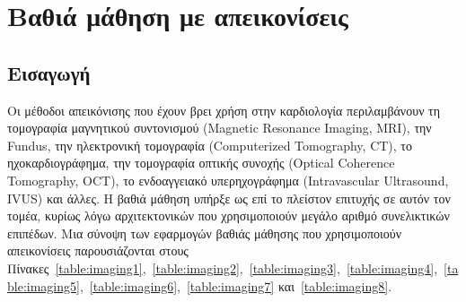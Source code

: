 \chapter{Βαθιά μάθηση με απεικονίσεις}
\label{chapter4}
\graphicspath{{./images/deep-learning-in-cardiology/}}

\section{Εισαγωγή}
Οι μέθοδοι απεικόνισης που έχουν βρει χρήση στην καρδιολογία περιλαμβάνουν τη τομογραφία μαγνητικού συντονισμού (Magnetic Resonance Imaging, MRI), την Fundus, την ηλεκτρονική τομογραφία (Computerized Tomography, CT), το ηχοκαρδιογράφημα, την τομογραφία οπτικής συνοχής (Optical Coherence Tomography, OCT), το ενδοαγγειακό υπερηχογράφημα (Intravascular Ultrasound, IVUS) και άλλες.
Η βαθιά μάθηση υπήρξε ως επί το πλείστον επιτυχής σε αυτόν τον τομέα, κυρίως λόγω αρχιτεκτονικών που χρησιμοποιούν μεγάλο αριθμό συνελικτικών επιπέδων.
Μια σύνοψη των εφαρμογών βαθιάς μάθησης που χρησιμοποιούν απεικονίσεις παρουσιάζονται στους Πίνακες~\ref{table:imaging1},~\ref{table:imaging2},~\ref{table:imaging3},~\ref{table:imaging4},~\ref{table:imaging5},~\ref{table:imaging6},~\ref{table:imaging7} και~\ref{table:imaging8}.

